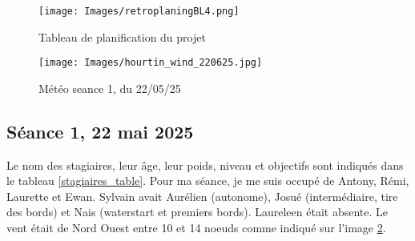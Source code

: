 \documentclass[11pt,a4paper]{report}
\begin{document}
\begin{figure}
\centering
\texttt{[image: Images/retroplaningBL4.png]} 
\caption{Tableau de planification du projet \label{gantt}}
\end{figure}
\begin{figure}
\centering
\texttt{[image: Images/hourtin\_wind\_220625.jpg]} 
\caption{Météo seance 1, du 22/05/25\label{meteo}}
\end{figure}
\subsection{Séance 1, 22 mai 2025}

Le nom des stagiaires, leur \^age, leur poids, niveau et objectifs sont
indiqués dans le tableau \ref{stagiaires_table}.
Pour ma séance, je me suis occupé de Antony, Rémi, Laurette et Ewan.
Sylvain avait Aurélien (autonome), Josué (intermédiaire, tire des bords)
et Nais (waterstart et premiers bords).
Laureleen était absente.
Le vent était de Nord Ouest entre 10 et 14 noeuds comme indiqué sur
l'image \ref{meteo}.
\end{document}
